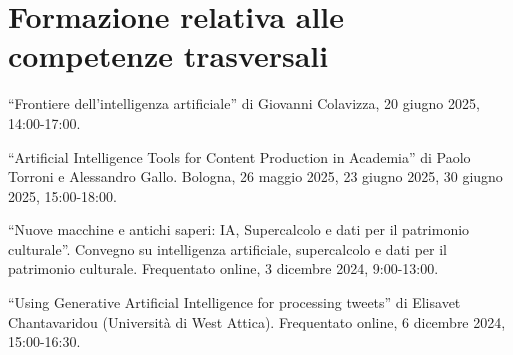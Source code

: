 \section{Formazione relativa alle competenze trasversali}

``Frontiere dell'intelligenza artificiale'' di Giovanni Colavizza, 20 giugno 2025, 14:00-17:00.

``Artificial Intelligence Tools for Content Production in Academia'' di Paolo Torroni e Alessandro Gallo. Bologna, 26 maggio 2025, 23 giugno 2025, 30 giugno 2025, 15:00-18:00.

``Nuove macchine e antichi saperi: IA, Supercalcolo e dati per il patrimonio culturale''. Convegno su intelligenza artificiale, supercalcolo e dati per il patrimonio culturale. Frequentato online, 3 dicembre 2024, 9:00-13:00.

``Using Generative Artificial Intelligence for processing tweets'' di Elisavet Chantavaridou (Università di West Attica). Frequentato online, 6 dicembre 2024, 15:00-16:30.